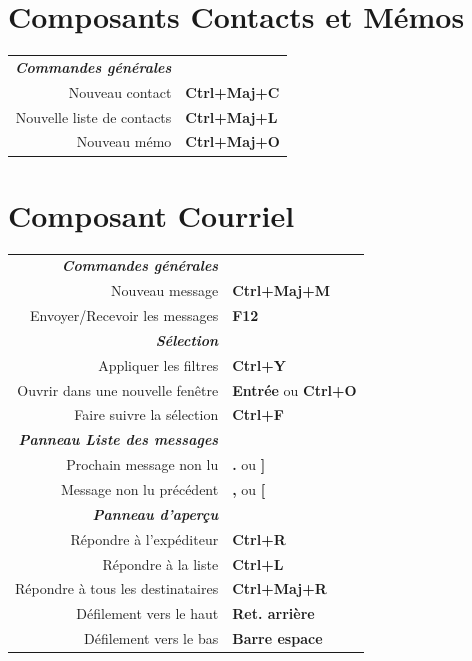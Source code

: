 \documentclass[12pt]{article}
\begin{document}
\begin{landscape}
\begin{center}
\begin{multicols}{2}
	\section*{Composants Contacts et Mémos}
	\begin{tabular*}{4in}{rp{1.5in}}
		\textit{\textbf{Commandes générales}}	&					\\
		Nouveau contact				& \textbf{Ctrl+Maj+C}			\\
		Nouvelle liste de contacts			& \textbf{Ctrl+Maj+L}			\\
		Nouveau mémo				& \textbf{Ctrl+Maj+O}			\\
	\end{tabular*}
	\section*{Composant Courriel}
	\begin{tabular*}{4in}{rp{1.5in}}
		\textit{\textbf{Commandes générales}}	&					\\
		Nouveau message				& \textbf{Ctrl+Maj+M}			\\
		\vspace{1.5mm}
		Envoyer/Recevoir les messages		& \textbf{F12}				\\
		\textit{\textbf{Sélection}}		&					\\
		Appliquer les filtres			& \textbf{Ctrl+Y}			\\
		Ouvrir dans une nouvelle fenêtre 	& \textbf{Entrée} ou \textbf{Ctrl+O}	\\
		\vspace{1.5mm}
		Faire suivre la sélection		& \textbf{Ctrl+F}			\\
		\textit{\textbf{Panneau Liste des messages}}	&					\\
		Prochain message non lu			& \textbf{.} ou \textbf{]}		\\
		\vspace{1.5mm}
		Message non lu précédent		& \textbf{,} ou \textbf{[}		\\
		\textit{\textbf{Panneau d'aperçu}}	&					\\
		Répondre à l'expéditeur			& \textbf{Ctrl+R}			\\
		Répondre à la liste			& \textbf{Ctrl+L}			\\
		Répondre à tous les destinataires 	& \textbf{Ctrl+Maj+R}			\\
		Défilement vers le haut			& \textbf{Ret. arrière}			\\
		Défilement vers le bas			& \textbf{Barre espace}			\\
	\end{tabular*}

\end{multicols}
\end{center}
\end{landscape}
\end{document}
